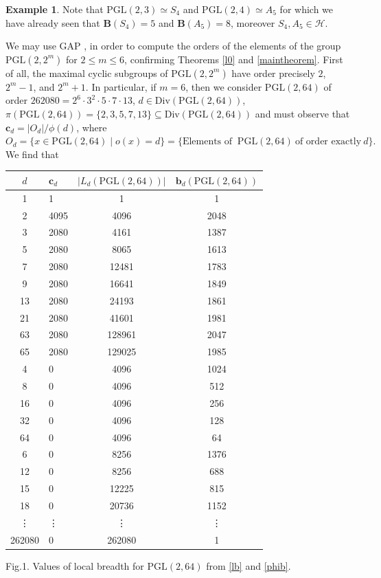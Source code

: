 \documentclass{amsart}
\theoremstyle{definition}
\newtheorem{example}[theorem]{Example}
\numberwithin{equation}{section}
\begin{document}
\begin{example}\label{e1}Note that $\mathrm{PGL}(2,3) \simeq S_4$ and  $\mathrm{PGL}(2,4) \simeq A_5$ for which we have already seen that $\mathbf{B}(S_4)=5$ and  $\mathbf{B}(A_5)=8$, moreover $S_4, A_5 \in \mathcal{H}$. 


We may use  GAP \cite{gap}, in order to compute the orders of the elements of the group $\mathrm{PGL}(2,2^m)$ for $ 2 \le m \leq 6$, confirming Theorems \ref{l0} and \ref{maintheorem}. First of all,  the maximal cyclic subgroups of $\mathrm{PGL}(2,2^m)$ have order precisely $2$, $2^m-1$, and $2^m+1$.  In particular, if $m=6$, then we consider $\mathrm{PGL}(2,64)$ of order $262080=2^{6} \cdot 3^{2} \cdot 5 \cdot 7 \cdot 13$, $d \in \mathrm{Div}(\mathrm{PGL}(2,64))$, $\pi(\mathrm{PGL}(2,64))=\{2,3,5,7,13\} \subseteq \mathrm{Div}(\mathrm{PGL}(2,64))$ and must observe that $\mathbf{c}_d=|O_d|/\phi(d)$, where
$O_d=\{x \in \mathrm{PGL}(2,64) \mid o(x)=d\}= \{ \mbox{Elements of } \ \mathrm{PGL}(2,64) \ \mbox{of order exactly} \ d\}.$ We find that
\begin{center}
\begin{tabular}{|c|l|c|c|}
            \hline
        $d$ & $\mathbf{c}_d$  & $|L_d(\mathrm{PGL}(2,64))|$ & $\mathbf{b}_d(\mathrm{PGL}(2,64))$ \\
    \hline    
    1  &   1      & 1  &  1 \\
    2  & 4095     & 4096  &  2048 \\
    3  & 2080     & 4161  &  1387 \\
    5  & 2080     & 8065  &  1613 \\
    7  & 2080    & 12481  &  1783 \\
    9  & 2080    & 16641  &  1849 \\
    13 & 2080    & 24193  &  1861 \\
    21 & 2080    & 41601  &  1981 \\
    63 & 2080    & 128961  & 2047 \\
    65 & 2080   & 129025  & 1985 \\
    4  & 0       & 4096  &  1024 \\
    8  & 0       & 4096  &  512 \\
    16 & 0       & 4096  &  256 \\
    32 & 0       & 4096  &  128 \\
    64 & 0       & 4096  &  64 \\
    6  & 0       & 8256  &  1376 \\
    12 & 0       & 8256  &  688 \\
    15 & 0       & 12225 &  815 \\
    18 & 0       & 20736  & 1152 \\
    \vdots &   \vdots      &  \vdots  &   \vdots \\
      262080 & 0    & 262080  &  1 \\
    \hline
    \end{tabular}
\end{center}
\centerline{Fig.1. Values of local breadth for $\mathrm{PGL}
(2,64)$ from \eqref{lb} and \eqref{phib}.}


\end{example}
\end{document}
